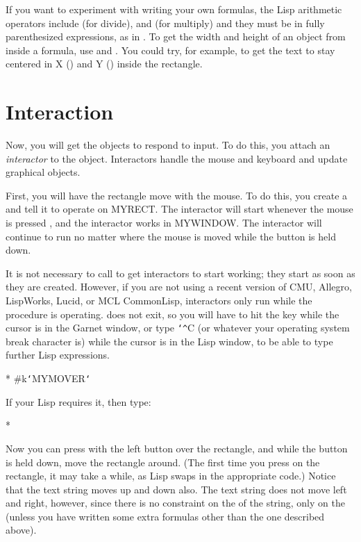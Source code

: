 If you want to experiment with writing your own formulas, the Lisp
arithmetic operators include  (for divide), and \pr{*} (for
multiply) and they must be in fully parenthesized expressions, as in
.
To get the width and height of an object from inside a
formula, use  and .  You could try, for example, to get the text to stay centered in
X () and Y () inside the rectangle.


\section{Interaction}

Now, you will get the objects to respond to input.  To do this, you attach
an {\it interactor} to the object.  Interactors handle the mouse and keyboard
and update graphical objects.

First, you will have the rectangle move with the mouse.  To do this, you
create a  and tell it to operate on MYRECT.
The interactor will start whenever the mouse is pressed ,
and the interactor works in MYWINDOW.  The interactor will continue to
run no matter where the mouse is moved while the button is held down.

It is not necessary to call
 to get interactors to start working; they start as soon as
they are created.  However, if you are not using a recent version of
CMU, Allegro, LispWorks, Lucid, or MCL CommonLisp, interactors only run
while the  procedure is operating.
 does not exit, so you will have to hit the  key
while the cursor is in the Garnet window, or type {\tt\char`\^}C (or
whatever your operating system break character is) while the cursor is in
the Lisp window, to be able to type further Lisp expressions.

\begin{programexample}
* 
\#k{\tt\char`\<}MYMOVER{\tt\char`\>}
\end{programexample}
If your Lisp requires it, then type:
\begin{programexample}
* 
\end{programexample}

Now you can press with the left button over the rectangle, and while the
button is held down, move the rectangle around.  (The first time you press
on the rectangle, it may take a while, as Lisp swaps in the appropriate code.)
Notice that the text
string moves up and down also.  The text string does not move left and
right, however, since there is no constraint on the  of the
string, only on the  (unless you have written some extra formulas
other than the one described above).

